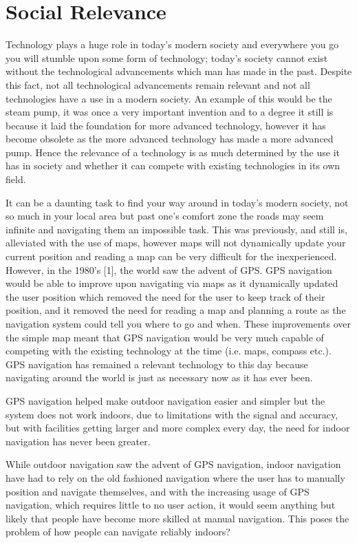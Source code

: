 \section{Social Relevance}
Technology plays a huge role in today's modern society and everywhere you go you will stumble upon some form of technology; today's society cannot exist without the technological advancements which man has made in the past.
Despite this fact, not all technological advancements remain relevant and not all technologies have a use in a modern society. An example of this would be the steam pump, it was once a very important invention and to a degree it still is because it laid the foundation for more advanced technology, however it has become obsolete as the more advanced technology has made a more advanced pump. Hence the relevance of a technology is as much determined by the use it has in society and whether it can compete with existing technologies in its own field.

It can be a daunting task to find your way around in today's modern society, not so much in your local area but past one's comfort zone the roads may seem infinite and navigating them an impossible task. This was previously, and still is, alleviated with the use of maps, however maps will not dynamically update your current position and reading a map can be very difficult for the inexperienced. However, in the 1980's [1], the world saw the advent of GPS. GPS navigation would be able to improve upon navigating via maps as it dynamically updated the user position which removed the need for the user to keep track of their position, and it removed the need for reading a map and planning a route as the navigation system could tell you where to go and when. These improvements over the simple map meant that GPS navigation would be very much capable of competing with the existing technology at the time (i.e. maps, compass etc.). GPS navigation has remained a relevant technology to this day because navigating around the world is just as necessary now as it has ever been.

GPS navigation helped make outdoor navigation easier and simpler but the system does not work indoors, due to limitations with the signal and accuracy, but with facilities getting larger and more complex every day, the need for indoor navigation has never been greater.

While outdoor navigation saw the advent of GPS navigation, indoor navigation have had to rely on the old fashioned navigation where the user has to manually position and navigate themselves, and with the increasing usage of GPS navigation, which requires little to no user action, it would seem anything but likely that people have become more skilled at manual navigation. This poses the problem of how people can navigate reliably indoors?

